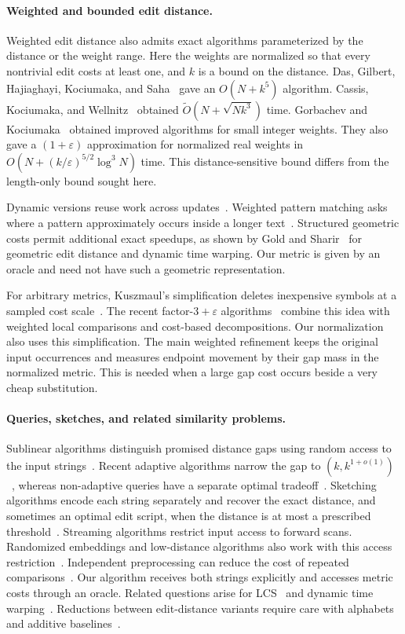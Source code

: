 \documentclass[11pt]{article}
\theoremstyle{definition}
\newcommand{\1}{\mathbf 1}
\begin{document}
\paragraph{Weighted and bounded edit distance.}
Weighted edit distance also admits exact algorithms parameterized by
the distance or the weight range.
Here the weights are normalized so that every nontrivial edit costs at
least one, and $k$ is a bound on the distance.
Das, Gilbert, Hajiaghayi, Kociumaka, and Saha~\cite{dghks2023}
gave an $O(N+k^5)$ algorithm.
Cassis, Kociumaka, and Wellnitz~\cite{ckw2023} obtained
$\widetilde O(N+\sqrt{Nk^3})$ time.
Gorbachev and Kociumaka~\cite{gk2025} obtained improved algorithms
for small integer weights. They also gave a $(1+\varepsilon)$
approximation for normalized real weights in
$O(N+(k/\varepsilon)^{5/2}\log^3 N)$ time.
This distance-sensitive bound differs from the length-only bound sought
here.

Dynamic versions reuse work across updates~\cite{ckm2020,bgk2025}.
Weighted pattern matching asks where a pattern approximately occurs
inside a longer text~\cite{ckw2025}.
Structured geometric costs permit additional exact speedups, as shown
by Gold and Sharir~\cite{gold_sharir2018} for geometric edit distance
and dynamic time warping.
Our metric is given by an oracle and need not have such a geometric
representation.

For arbitrary metrics, Kuszmaul's simplification deletes inexpensive
symbols at a sampled cost scale~\cite{kuszmaul2019}.
The recent factor-$3+\varepsilon$ algorithms~\cite{mtw,dkk}
combine this idea with weighted local comparisons and cost-based
decompositions.
Our normalization also uses this simplification.
The main weighted refinement keeps the original input occurrences and
measures endpoint movement by their gap mass in the normalized metric.
This is needed when a large gap cost occurs beside a very cheap
substitution.

\paragraph{Queries, sketches, and related similarity problems.}
Sublinear algorithms distinguish promised distance gaps using random
access to the input strings~\cite{BEKMRRS03,GKS19,KocSaha20,BCR20}.
Recent adaptive algorithms narrow the gap to
$(k,k^{1+o(1)})$~\cite{BCFN22,BCFK24}, whereas non-adaptive queries
have a separate optimal tradeoff~\cite{GKKS22}.
Sketching algorithms encode each string separately and recover the
exact distance, and sometimes an optimal edit script, when the distance
is at most a prescribed threshold~\cite{BZ16,KPS21,BhatKoucky23,KS24}.
Streaming algorithms restrict input access to forward scans.
Randomized embeddings and low-distance algorithms also work with this
access restriction~\cite{CGK16,BZ16,KPS21}.
Independent preprocessing can reduce the cost of repeated
comparisons~\cite{GRS20}.
Our algorithm receives both strings explicitly and accesses metric costs
through an oracle.
Related questions arise for LCS~\cite{BK15,MR26} and dynamic time
warping~\cite{BK15,kuszmaul2019}.
Reductions between edit-distance variants require care with alphabets
and additive baselines~\cite{BDGK24}.
\end{document}
